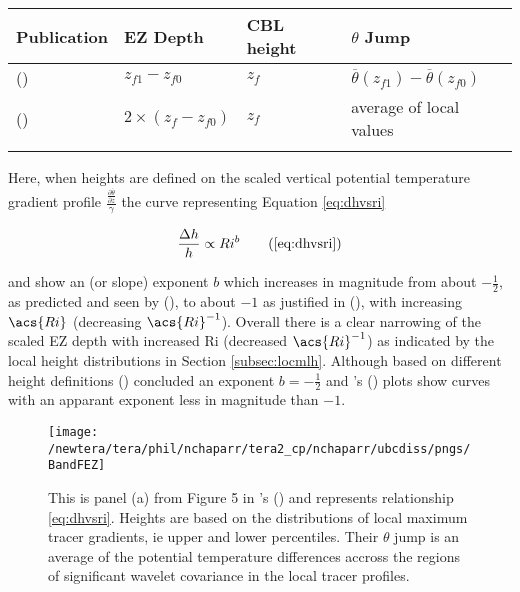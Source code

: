 \begin{table}[htbp]
\label{table:el}
\begin{center}
\begin{tabular}{ p{4cm} p{2cm} p{1.5cm} p{3cm}}
Publication & \acs{EZ} Depth & \acs{CBL} height & $\theta$ Jump\\ \hline
\citeauthor{FedConzMir04} (\citeyear{FedConzMir04}) & $z_{f1} - z_{f0}$ & $z_{f}$ &  $\overline{\theta}(z_{f1})-\overline{\theta}(z_{f0})$\\ [.3cm] %
\citeauthor{BrooksFowler2} (\citeyear{BrooksFowler2}) & $2 \times (z_{f} - z_{f0})$ & $z_{f}$ & average of local values\\ \hline
\label{table:el}
\end{tabular}
\end{center}    
\end{table}


Here, when heights are defined on the scaled vertical potential temperature gradient profile $\frac{\frac{\partial \overline{\theta}}{\partial z}}{\gamma}$ the curve representing Equation \ref{eq:dhvsri} 

\begin{equation}
\frac{\Delta h}{h} \propto Ri^{b} \tag{\ref{eq:dhvsri}}
\end{equation}

and show an (or slope) exponent $b$ which increases in magnitude from about $-\frac{1}{2}$, as predicted and seen by \citeauthor{Boers89} (\citeyear{Boers89}), to about $-1$ as justified in \citeauthor{StullNelEl} (\citeyear{StullNelEl}),  with increasing $\acs{Ri}$ (decreasing $\acs{Ri}^{-1}$).  Overall there is a clear narrowing of the scaled \acs{EZ} depth with increased \acs{Ri} (decreased $\acs{Ri}^{-1}$) as indicated by the local height distributions in Section \ref{subsec:locmlh}.  Although based on different height definitions \citeauthor{FedConzMir04} (\citeyear{FedConzMir04}) concluded an exponent $b = -\frac{1}{2}$ and \citeauthor{BrooksFowler2}'s (\citeyear{BrooksFowler2}) plots show curves with an apparant exponent less in magnitude than $-1$. 

\begin{figure}[htbp]
    \centering
    \texttt{[image: /newtera/tera/phil/nchaparr/tera2\_cp/nchaparr/ubcdiss/pngs/BandFEZ]}
    \caption[Relationship of Scaled \acs{EZ} depth to Richardson number from \citeauthor{BrooksFowler2}'s (\citeyear{BrooksFowler2})]{This is panel (a) from Figure 5 in \citeauthor{BrooksFowler2}'s (\citeyear{BrooksFowler2}) and represents relationship \ref{eq:dhvsri}.  Heights are based on the distributions of local maximum tracer gradients, ie upper and lower percentiles.  Their $\theta$ jump is an average of the potential temperature differences accross the regions of significant wavelet covariance in the local tracer profiles.}
    \label{fig:BandFEZ}   %
\end{figure}


